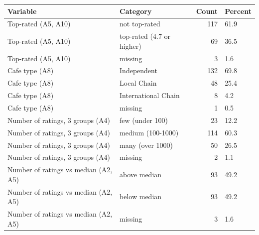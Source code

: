 \begin{table}[ht]
\centering
\begingroup\footnotesize
\begin{tabular}{llrl}
  \toprule
Variable & Category & Count & Percent \\ 
  \midrule
Top-rated (A5, A10) & not top-rated & 117 & 61.9 \\ 
  Top-rated (A5, A10) & top-rated (4.7 or higher) &  69 & 36.5 \\ 
  Top-rated (A5, A10) & missing &   3 & 1.6 \\ 
  Cafe type (A8) & Independent & 132 & 69.8 \\ 
  Cafe type (A8) & Local Chain &  48 & 25.4 \\ 
  Cafe type (A8) & International Chain &   8 & 4.2 \\ 
  Cafe type (A8) & missing &   1 & 0.5 \\ 
  Number of ratings, 3 groups (A4) & few (under 100) &  23 & 12.2 \\ 
  Number of ratings, 3 groups (A4) & medium (100-1000) & 114 & 60.3 \\ 
  Number of ratings, 3 groups (A4) & many (over 1000) &  50 & 26.5 \\ 
  Number of ratings, 3 groups (A4) & missing &   2 & 1.1 \\ 
  Number of ratings vs median (A2, A5) & above median &  93 & 49.2 \\ 
  Number of ratings vs median (A2, A5) & below median &  93 & 49.2 \\ 
  Number of ratings vs median (A2, A5) & missing &   3 & 1.6 \\ 
   \bottomrule
\end{tabular}
\endgroup
\end{table}
